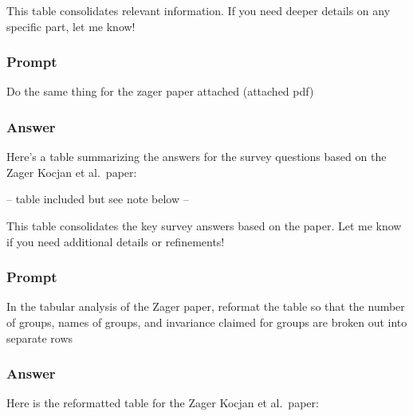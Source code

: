 \documentclass[
  english,
  man]{apa7}
\begin{document}
This table consolidates relevant information. If you need deeper details on any specific part, let me know!

\subsubsection{Prompt}\label{prompt-1}

Do the same thing for the zager paper attached (attached pdf)

\subsubsection{Answer}\label{answer-1}

Here's a table summarizing the answers for the survey questions based on the Zager Kocjan et al.~paper:

-- table included but see note below --

This table consolidates the key survey answers based on the paper. Let me know if you need additional details or refinements!

\subsubsection{Prompt}\label{prompt-2}

In the tabular analysis of the Zager paper, reformat the table so that the number of groups, names of groups, and invariance claimed for groups are broken out into separate rows

\subsubsection{Answer}\label{answer-2}

Here is the reformatted table for the Zager Kocjan et al.~paper:
\end{document}
